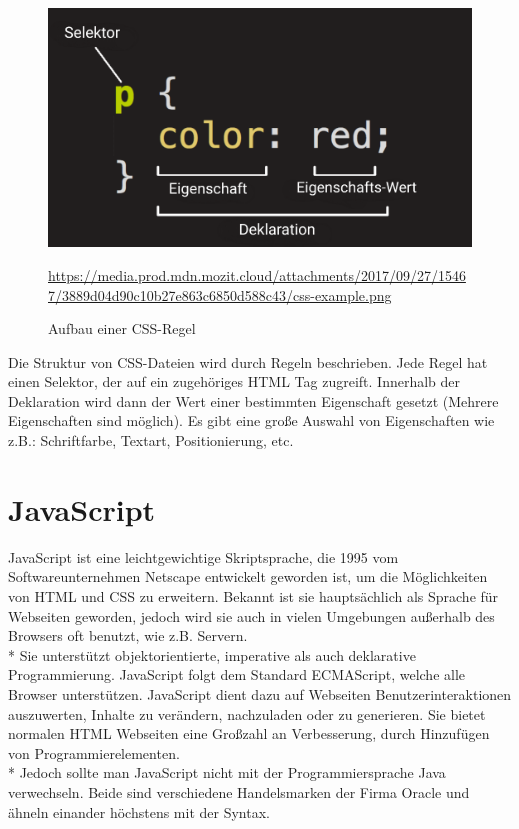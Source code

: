 \begin{figure}[htp]
    \centering
    \includegraphics[scale=0.3]{pics/CSSRegel.png}
    \caption{Aufbau einer CSS-Regel}
        \small \url{https://media.prod.mdn.mozit.cloud/attachments/2017/09/27/15467/3889d04d90c10b27e863c6850d588c43/css-example.png}
    \label{fig:impl:CSSRule}
\end{figure}

Die Struktur von CSS-Dateien wird durch Regeln beschrieben. Jede Regel hat einen Selektor, der auf ein zugehöriges HTML Tag zugreift.
Innerhalb der Deklaration wird dann der Wert einer bestimmten Eigenschaft gesetzt (Mehrere Eigenschaften sind möglich).
Es gibt eine große Auswahl von Eigenschaften wie z.B.: Schriftfarbe, Textart, Positionierung, etc. \cite{CSSMozilla}

\section{JavaScript}
\author{Benjamin Besic}
JavaScript ist eine leichtgewichtige Skriptsprache, die 1995 vom Softwareunternehmen Netscape entwickelt geworden ist, um die Möglichkeiten von HTML und CSS zu erweitern.
Bekannt ist sie hauptsächlich als Sprache für Webseiten geworden, jedoch wird sie auch in vielen Umgebungen außerhalb des Browsers oft benutzt, wie z.B. Servern. 
\\* Sie unterstützt objektorientierte, imperative als auch deklarative Programmierung. JavaScript folgt dem Standard ECMAScript, welche alle Browser unterstützen. 
JavaScript dient dazu auf Webseiten Benutzerinteraktionen auszuwerten, Inhalte zu verändern, nachzuladen oder zu generieren. Sie bietet normalen HTML Webseiten eine Großzahl an Verbesserung, durch Hinzufügen von Programmierelementen. \\*
Jedoch sollte man JavaScript nicht mit der Programmiersprache Java verwechseln. Beide sind verschiedene Handelsmarken der Firma Oracle und ähneln einander höchstens mit der Syntax.
\cite{JSWiki} \cite{JSMozilla}
